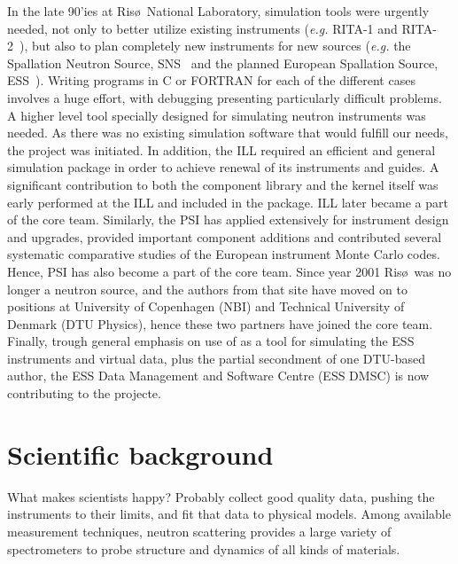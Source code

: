 In the late 90'ies at Ris\o\ National Laboratory,
simulation tools were urgently needed,
not only to better utilize existing instruments
({\em e.g.} RITA-1 and RITA-2~\cite{cjp_73_697,pb_241_50,pb_283_343}),
but also to plan completely new instruments for new sources
({\em e.g.} the Spallation Neutron Source, SNS~\cite{sns_webpage}
and the planned European Spallation Source, ESS~\cite{ess_webpage}).
Writing programs in C or FORTRAN for
each of the different cases involves a huge effort, with debugging presenting
particularly difficult problems. A higher level tool specially designed
for simulating neutron instruments was needed. As there was
no existing simulation software that would fulfill our needs, the \MCS
project was initiated.
In addition, the ILL required an efficient and general simulation
package in order to achieve renewal of its instruments and guides.
A significant contribution to both the component library and the \MCS
kernel itself was early performed at the ILL and included in the package.
ILL later became a part of the core \MCS team.
Similarly, the PSI has applied \MCS extensively for instrument design
and upgrades, provided important component additions and contributed
several systematic comparative studies of the European instrument
Monte Carlo codes. Hence, PSI has also become a part of the core \MCS
team. 
Since year 2001 Ris\o\ was no longer a neutron source, and the authors
from that site have moved on to positions at University of Copenhagen
(NBI) and Technical University of Denmark (DTU Physics), hence these
two partners have joined the core \MCS team.
Finally, trough general emphasis on use of \MCS as a tool for
simulating the ESS instruments and virtual data, plus the partial
secondment of one DTU-based \MCS author, the ESS Data Management and
Software Centre (ESS DMSC) is now contributing to the projecte.

\section{Scientific background}
What makes scientists happy? Probably collect good quality data, pushing the instruments to their limits, and fit that data to physical models.
Among available measurement techniques, neutron scattering provides a
large variety of spectrometers to probe structure and dynamics of all
kinds of materials.

